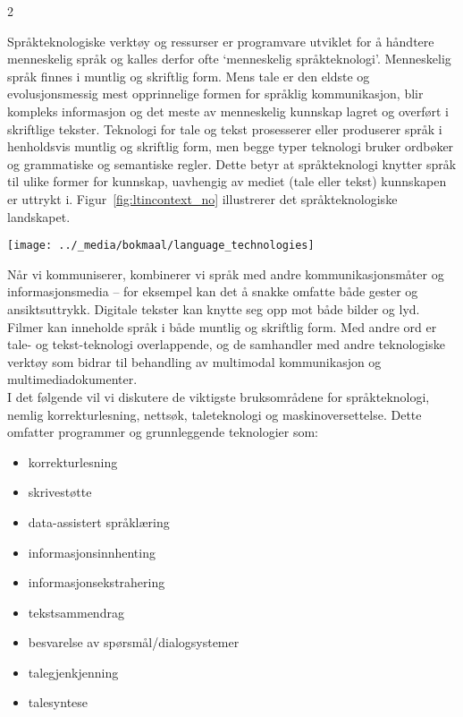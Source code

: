 \clearpage


\begin{multicols}{2}

Språkteknologiske verktøy og ressurser er programvare utviklet for å håndtere menneskelig språk og kalles derfor ofte `menneskelig språkteknologi'. 
Menneskelig språk finnes i muntlig og skriftlig form. Mens tale er den eldste og evolusjonsmessig mest opprinnelige formen for språklig kommunikasjon, blir kompleks informasjon og det meste av menneskelig kunnskap lagret og overført i skriftlige tekster. Teknologi for tale og tekst prosesserer eller produserer språk i henholdsvis muntlig og skriftlig form, men begge typer teknologi bruker ordbøker og grammatiske og semantiske regler. Dette betyr at språkteknologi knytter språk til ulike former for kunnskap, uavhengig av mediet (tale eller tekst) kunnskapen er uttrykt i. Figur~\ref{fig:ltincontext_no} illustrerer det språkteknologiske landskapet.

\begin{figure*}[htb]
  \center
  \texttt{[image: ../\_media/bokmaal/language\_technologies]}
  \caption{Språkteknologi i kontekst}
  \label{fig:ltincontext_no}
\end{figure*}

Når vi kommuniserer, kombinerer vi språk med andre kommunikasjonsmåter og informasjonsmedia -- for eksempel kan det å snakke omfatte både gester og ansiktsuttrykk. Digitale tekster kan knytte seg opp mot både bilder og lyd. Filmer kan inneholde språk i både muntlig og skriftlig form. Med andre ord er tale- og tekst-teknologi overlappende, og de samhandler med andre teknologiske verktøy som bidrar til behandling av multimodal kommunikasjon og multimediadokumenter.\\ 
I det følgende vil vi diskutere de viktigste bruksområdene for språkteknologi, nemlig korrekturlesning, nettsøk, taleteknologi og maskinoversettelse. Dette omfatter programmer og grunnleggende teknologier som:

\begin{itemize}
\item korrekturlesning
\item skrivestøtte
\item data-assistert språklæring
\item informasjonsinnhenting  
\item informasjonsekstrahering
\item tekstsammendrag
\item besvarelse av spørsmål/dialogsystemer
\item talegjenkjenning 
\item talesyntese 
\end{itemize}


\end{multicols}
